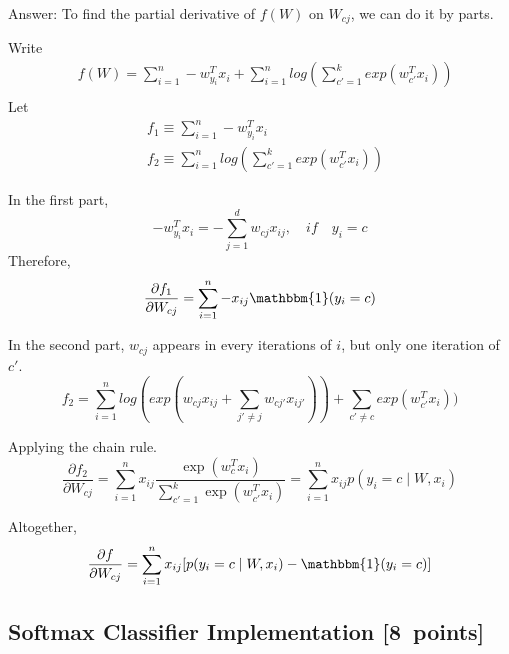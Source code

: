 \documentclass{article}
\newenvironment{answer}{\par\begingroup\color{gre}Answer: }{\endgroup}
\newcommand\pts[1]{\textcolor{pointscolour}{[#1~points]}}
\begin{document}
\begin{answer}
    To find the partial derivative of $f(W)$ on $W_{cj}$, we can do it by parts.
    
    Write
    \begin{align*}
        &f(W) = \sum_{i = 1}^n - w_{y_i}^T x_i + \sum_{i = 1}^n log(\sum_{c' = 1}^k exp(w_{c'}^T x_i)) \\
    \end{align*}
    Let
    \begin{align*}
        &f_1 \equiv \sum_{i = 1}^n - w_{y_i}^T x_i   \\
        &f_2 \equiv \sum_{i = 1}^n log(\sum_{c' = 1}^k exp(w_{c'}^T x_i))  
    \end{align*}

    In the first part,
    \begin{equation*}
        -w_{y_i}^T x_i = - \sum_{j = 1}^d w_{cj} x_{ij}, \quad \textit{if} \quad y_i = c
    \end{equation*}
    Therefore, 
    \begin{equation*}
        \frac{\partial f_1 }{\partial W_{cj}} = \sum_{i = 1}^n -x_{ij} \mathbbm{1}(y_i = c)
    \end{equation*}

    In the second part, $w_{cj}$ appears in every iterations of $i$, but only one iteration of $c'$. 
    \begin{equation*}
        f_2 = \sum_{i = 1}^n log( exp(w_{cj} x_{ij} + \sum_{j' \neq j} w_{cj'} x_{ij'})) + \sum_{c' \neq c} exp(w_{c'}^T x_i))  
    \end{equation*}
    
    Applying the chain rule.
    \begin{equation*}
        \frac{\partial f_2 }{\partial W_{cj}} = \sum_{i = 1}^n x_{ij} \frac{\exp(w_c^Tx_i)}{\sum_{c'=1}^k\exp(w_{c'}^Tx_i)} = \sum_{i = 1}^n x_{ij} p(y_i=c \mid W, x_i)
    \end{equation*}

    Altogether,
    \begin{equation*}
        \frac{\partial f}{\partial W_{cj}} = \sum_{i=1}^n x_{ij}[p(y_i=c \mid W,x_i) - \mathbbm{1}(y_i = c)] 
    \end{equation*}

\end{answer}

\subsection{Softmax Classifier Implementation \pts{8}}
\end{document}
